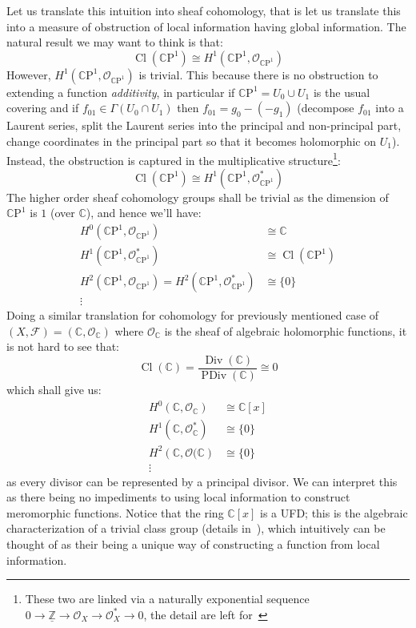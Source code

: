 \documentclass{book}
\newcommand{\Z}{{\mathbb{Z}}}
\newcommand{\C}{{\mathbb{C}}}
\newcommand{\CF}{{\mathcal{F}}}
\newcommand{\CO}{{\mathcal{O}}}
\newcommand{\CP}{{\mathbb{C}\mathrm{P}}}
\newcommand{\Div}{{\operatorname{Div}}}
\newcommand{\PDiv}{{\operatorname{PDiv}}}
\newcommand{\Cl}{{\operatorname{Cl}}}
\begin{document}
Let us translate this intuition into sheaf cohomology, that is let us translate this into a measure of
obstruction of local information having global information. The natural result we may want to think is that:
\[
  \Cl(\CP^1) \cong H^1(\CP^1, \CO_{\CP^1})
\]
However, $H^1(\CP^1, \CO_{\CP^1})$ is trivial. This because there is no obstruction to extending a function
\emph{additivity}, in particular if $\CP^1 = U_0 \cup U_1$ is the usual covering and if $f_{01} \in
\Gamma(U_0\cap U_1)$ then $f_{01} = g_0 - (-g_1)$ (decompose $f_{01}$ into a Laurent series, split the Laurent
series into the principal and non-principal part, change coordinates in the principal part so that it becomes
holomorphic on $U_1$). Instead, the obstruction is captured in the multiplicative structure\footnote{These
 two are linked via a naturally exponential sequence $0 \to \underline{\Z} \to \CO_X \to \CO_X^* \to 0$, the detail are
left for~\cite{NateAlgGeo}}:
\[
  \Cl(\CP^1) \cong H^1(\CP^1, \CO_{\CP^1}^*)
\]
The
higher order sheaf cohomology groups shall be trivial as the dimension of $\CP^1$ is $1$ (over $\C$), and
hence we'll have:
\begin{align*}
  H^0(\CP^1, \CO_{\CP^1}) &\cong \C\\
  H^1(\CP^1, \CO_{\CP^1}^*) &\cong \Cl(\CP^1)\\
  H^2(\CP^1, \CO_{\CP^1}) = H^2(\CP^1, \CO_{\CP^1}^*)&\cong \{0\}\\
  \vdots
\end{align*}
Doing a similar translation for cohomology for previously mentioned case of $(X, \CF) = (\C, \CO_\C)$ where
$\CO_\C$ is the sheaf of algebraic holomorphic functions, it is not hard to see that:
\[
  \Cl(\C) = \frac{\Div(\C)}{\PDiv(\C)} \cong 0
\]
which shall give us:
\begin{align*}
  H^0(\C, \CO_{\C}) &\cong \C[x]\\
  H^1(\C, \CO_{\C}^*) &\cong \{0\}\\
  H^2(\C, \CO{(\C}) &\cong \{0\}\\
  \vdots
\end{align*}
as every divisor can be represented by a principal divisor. We can interpret this as there being no
impediments to using local information to construct meromorphic functions. Notice that the ring $\C[x]$ is
a UFD; this is the algebraic characterization of a trivial class group (details in~\cite{NateAlgGeo}), which
intuitively can be thought of as their being a unique way of constructing a function from local
information.
\end{document}
